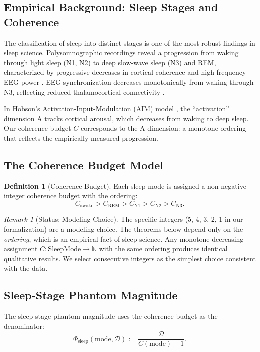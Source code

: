 \documentclass[11pt, a4paper]{article}
\theoremstyle{definition}
\newtheorem{definition}[theorem]{Definition}
\theoremstyle{remark}
\newtheorem{remark}[theorem]{Remark}
\begin{document}
\subsection{Empirical Background: Sleep Stages and Coherence}

The classification of sleep into distinct stages is one of the most
robust findings in sleep science. Polysomnographic recordings reveal
a progression from waking through light sleep (N1, N2) to deep
slow-wave sleep (N3) and REM, characterized by progressive decreases
in cortical coherence and high-frequency EEG power
\cite{Hobson2005,Walker2017,Tononi2006}. EEG synchronization
decreases monotonically from waking through N3, reflecting reduced
thalamocortical connectivity \cite{Massimini2005}.

In Hobson's Activation-Input-Modulation (AIM) model
\cite{Hobson2000}, the ``activation'' dimension A tracks cortical
arousal, which decreases from waking to deep sleep. Our coherence
budget $C$ corresponds to the A dimension: a monotone ordering that
reflects the empirically measured progression.

\subsection{The Coherence Budget Model}

\begin{definition}[Coherence Budget]\label{def:coherence}
Each sleep mode is assigned a non-negative integer coherence budget
with the ordering:
\[
C_{\mathrm{awake}} > C_{\mathrm{REM}} > C_{\mathrm{N1}} >
C_{\mathrm{N2}} > C_{\mathrm{N3}}.
\]
\end{definition}

\begin{remark}[Status: Modeling Choice]
The specific integers (5, 4, 3, 2, 1 in our formalization) are a
modeling choice. The theorems below depend only on the
\emph{ordering}, which is an empirical fact of sleep science. Any
monotone decreasing assignment $C : \mathrm{SleepMode} \to
\mathbb{N}$ with the same ordering produces identical qualitative
results. We select consecutive integers as the simplest choice
consistent with the data.
\end{remark}

\subsection{Sleep-Stage Phantom Magnitude}

The sleep-stage phantom magnitude uses the coherence budget as
the denominator:
\begin{equation}\label{eq:sleep-phantom}
    \Phi_{\mathrm{sleep}}(\mathrm{mode}, \mathcal{D})
    := \frac{|\mathcal{D}|}{C(\mathrm{mode}) + 1}.
\end{equation}
\end{document}
